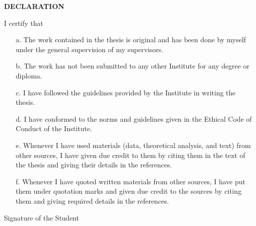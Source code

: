 \newpage
\thispagestyle{empty}
\vspace*{2cm}
\begin{flushleft}
	\textbf{\Large{DECLARATION}}
\end{flushleft}
\vspace{1cm}
\begin{spacing}{1.3}
	I certify that
	\begin{itemize}
		\item[a.] The work contained in the thesis is original and has been done by myself under the general supervision of my supervisors.
		\item[b.] The work has not been submitted to any other Institute for any degree or diploma.
		\item[c.] I have followed the guidelines provided by the Institute in writing the thesis.
		\item[d.] I have conformed to the norms and guidelines given in the Ethical Code of Conduct of the Institute.
		\item[e.] Whenever I have used materials (data, theoretical analysis, and text) from other sources, I have given due credit to them by citing them in the text of the thesis and giving their details in the references.
		\item[f.] Whenever I have quoted written materials from other sources, I have put them under quotation marks and given due credit to the sources by citing them and giving required details in the references.
	\end{itemize}
	\vspace{2.5cm}
	\begin{flushright}
		Signature of the Student
	\end{flushright}
\end{spacing} 
